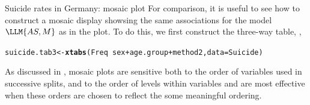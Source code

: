 \documentclass[11pt]{book}\usepackage[]{graphicx}\usepackage[]{color}
\makeatletter
\newcommand{\hlopt}[1]{\textcolor[rgb]{0,0,0}{#1}}%
\newcommand{\hlstd}[1]{\textcolor[rgb]{0.345,0.345,0.345}{#1}}%
\newcommand{\hlkwb}[1]{\textcolor[rgb]{0.69,0.353,0.396}{#1}}%
\newcommand{\hlkwc}[1]{\textcolor[rgb]{0.333,0.667,0.333}{#1}}%
\newcommand{\hlkwd}[1]{\textcolor[rgb]{0.737,0.353,0.396}{\textbf{#1}}}%
\newenvironment{kframe}{%
 \def\at@end@of@kframe{}%
 \ifinner\ifhmode%
  \def\at@end@of@kframe{\end{minipage}}%
  \begin{minipage}{\columnwidth}%
 \fi\fi%
 \def\FrameCommand##1{\hskip\@totalleftmargin \hskip-\fboxsep
 \colorbox{shadecolor}{##1}\hskip-\fboxsep
     \hskip-\linewidth \hskip-\@totalleftmargin \hskip\columnwidth}%
 \MakeFramed {\advance\hsize-\width
   \@totalleftmargin\z@ \linewidth\hsize
   \@setminipage}}%
 {\par\unskip\endMakeFramed%
 \at@end@of@kframe}
\newenvironment{knitrout}{}{} %
\renewenvironment{knitrout}{\small\renewcommand{\baselinestretch}{.85}}{} %
\makeatother
\begin{document}
\begin{Example}[suicide2]{Suicide rates in Germany: mosaic plot}
For comparison, it is useful to see how to construct a mosaic display 
showsing the same associations for the \loglin model $\LLM{AS,M}$
as in the \ca plot.  To do this, we first construct the 
three-way table, ,
\begin{knitrout}
\color{fgcolor}\begin{kframe}
\begin{alltt}
\hlstd{suicide.tab3} \hlkwb{<-} \hlkwd{xtabs}\hlstd{(Freq} \hlopt{~} \hlstd{sex} \hlopt{+} \hlstd{age.group} \hlopt{+} \hlstd{method2,} \hlkwc{data}\hlstd{=Suicide)}
\end{alltt}
\end{kframe}
\end{knitrout}

As discussed in , mosaic plots are sensitive both to
the order of variables used in successive splits, and to the order of
levels within variables and are most effective when these orders
are chosen to reflect the some meaningful ordering.


\end{Example}
\end{document}
